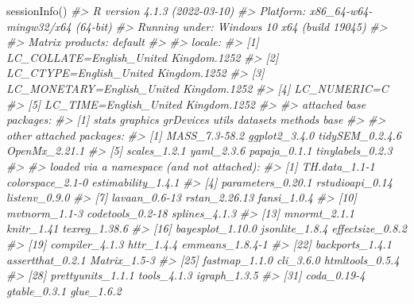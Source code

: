 \documentclass[
  man,floatsintext]{apa6}
\newenvironment{Shaded}{\begin{snugshade}}{\end{snugshade}}
\newcommand{\CommentTok}[1]{\textcolor[rgb]{0.56,0.35,0.01}{\textit{#1}}}
\newcommand{\FunctionTok}[1]{\textcolor[rgb]{0.00,0.00,0.00}{#1}}
\newcommand{\NormalTok}[1]{#1}
\begin{document}
\begin{Shaded}
\begin{Highlighting}[]
\FunctionTok{sessionInfo}\NormalTok{()}
\CommentTok{\#\textgreater{} R version 4.1.3 (2022{-}03{-}10)}
\CommentTok{\#\textgreater{} Platform: x86\_64{-}w64{-}mingw32/x64 (64{-}bit)}
\CommentTok{\#\textgreater{} Running under: Windows 10 x64 (build 19045)}
\CommentTok{\#\textgreater{} }
\CommentTok{\#\textgreater{} Matrix products: default}
\CommentTok{\#\textgreater{} }
\CommentTok{\#\textgreater{} locale:}
\CommentTok{\#\textgreater{} [1] LC\_COLLATE=English\_United Kingdom.1252 }
\CommentTok{\#\textgreater{} [2] LC\_CTYPE=English\_United Kingdom.1252   }
\CommentTok{\#\textgreater{} [3] LC\_MONETARY=English\_United Kingdom.1252}
\CommentTok{\#\textgreater{} [4] LC\_NUMERIC=C                           }
\CommentTok{\#\textgreater{} [5] LC\_TIME=English\_United Kingdom.1252    }
\CommentTok{\#\textgreater{} }
\CommentTok{\#\textgreater{} attached base packages:}
\CommentTok{\#\textgreater{} [1] stats     graphics  grDevices utils     datasets  methods   base     }
\CommentTok{\#\textgreater{} }
\CommentTok{\#\textgreater{} other attached packages:}
\CommentTok{\#\textgreater{} [1] MASS\_7.3{-}58.2    ggplot2\_3.4.0    tidySEM\_0.2.4.6  OpenMx\_2.21.1   }
\CommentTok{\#\textgreater{} [5] scales\_1.2.1     yaml\_2.3.6       papaja\_0.1.1     tinylabels\_0.2.3}
\CommentTok{\#\textgreater{} }
\CommentTok{\#\textgreater{} loaded via a namespace (and not attached):}
\CommentTok{\#\textgreater{}   [1] TH.data\_1.1{-}1         colorspace\_2.1{-}0      estimability\_1.4.1   }
\CommentTok{\#\textgreater{}   [4] parameters\_0.20.1     rstudioapi\_0.14       listenv\_0.9.0        }
\CommentTok{\#\textgreater{}   [7] lavaan\_0.6{-}13         rstan\_2.26.13         fansi\_1.0.4          }
\CommentTok{\#\textgreater{}  [10] mvtnorm\_1.1{-}3         codetools\_0.2{-}18      splines\_4.1.3        }
\CommentTok{\#\textgreater{}  [13] mnormt\_2.1.1          knitr\_1.41            texreg\_1.38.6        }
\CommentTok{\#\textgreater{}  [16] bayesplot\_1.10.0      jsonlite\_1.8.4        effectsize\_0.8.2     }
\CommentTok{\#\textgreater{}  [19] compiler\_4.1.3        httr\_1.4.4            emmeans\_1.8.4{-}1      }
\CommentTok{\#\textgreater{}  [22] backports\_1.4.1       assertthat\_0.2.1      Matrix\_1.5{-}3         }
\CommentTok{\#\textgreater{}  [25] fastmap\_1.1.0         cli\_3.6.0             htmltools\_0.5.4      }
\CommentTok{\#\textgreater{}  [28] prettyunits\_1.1.1     tools\_4.1.3           igraph\_1.3.5         }
\CommentTok{\#\textgreater{}  [31] coda\_0.19{-}4           gtable\_0.3.1          glue\_1.6.2           }

\end{Highlighting}
\end{Shaded}
\end{document}
